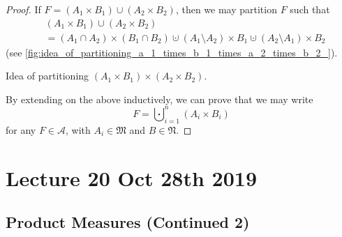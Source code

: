 \documentclass[notoc,notitlepage]{tufte-book}
\begin{document}
\begin{proof}
  If $F = (A_1 \times B_1) \cup (A_2 \times B_2)$,
  then we may partition $F$ such that
  \begin{align*}
    &(A_1 \times B_1) \cup (A_2 \times B_2) \\
    &= (A_1 \cap A_2) \times (B_1 \cap B_2)
      \cupdot (A_1 \setminus A_2) \times B_1
      \cupdot (A_2 \setminus A_1) \times B_2
  \end{align*}
  (see \cref{fig:idea_of_partitioning_a_1_times_b_1_times_a_2_times_b_2_}).
  \begin{marginfigure}
    \centering
    \caption{Idea of partitioning $(A_1 \times B_1) \times (A_2 \times B_2)$.}\label{fig:idea_of_partitioning_a_1_times_b_1_times_a_2_times_b_2_}
  \end{marginfigure}
  By extending on the above inductively, we can prove that we may write
  \begin{equation*}
    F = \bigcupdot_{i=1}^{n} (A_i \times B_i) 
  \end{equation*}
  for any $F \in \mathcal{A}$,
  with $A_i \in \mathfrak{M}$ and $B \in \mathfrak{N}$. \dashv

\end{proof}



\chapter{Lecture 20 Oct 28th 2019}%
\label{chp:lecture_20_oct_28th_2019}

\section{Product Measures (Continued 2)}%
\label{sec:product_measures_continued_2}
\end{document}
